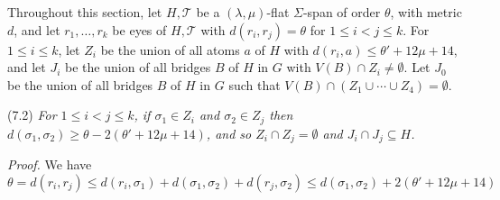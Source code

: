 Throughout this section, let $H, \mathcal{T}$ be a $(\lambda, \mu)$-flat $\Sigma$-span of order $\theta$, with metric $d$, and let $r_1, \ldots, r_k$ be eyes of $H, \mathcal{T}$ with $d(r_i, r_j) = \theta$ for $1 \le i < j \le k$. For $1 \le i \le k$, let $Z_i$ be the union of all atoms $a$ of $H$ with $d(r_i, a) \le \theta' + 12\mu + 14$, and let $J_i$ be the union of all bridges $B$ of $H$ in $G$ with $V(B) \cap Z_i \ne \emptyset$. Let $J_0$ be the union of all bridges $B$ of $H$ in $G$ such that $V(B) \cap (Z_1 \cup \cdots \cup Z_4) = \emptyset$.

\stmt
(7.2) \textit{For $1 \le i < j \le k$, if $\sigma_1 \in Z_i$ and $\sigma_2 \in Z_j$ then $d(\sigma_1, \sigma_2) \ge \theta - 2(\theta' + 12\mu + 14)$, and so $Z_i \cap Z_j = \emptyset$ and $J_i \cap J_j \subseteq H$.}

\textit{Proof.} We have
\begin{equation*}
\theta = d(r_i, r_j) \le d(r_i, \sigma_1) + d(\sigma_1, \sigma_2) + d(r_j, \sigma_2) \le d(\sigma_1, \sigma_2) + 2(\theta' + 12\mu + 14)
\end{equation*}
